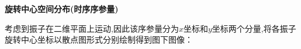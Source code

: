 \documentclass{article}
\begin{document}


\newpage
\noindent\textbf{旋转中心空间分布(时序序参量)}

考虑到振子在二维平面上运动,因此该序参量分为$x$坐标和$y$坐标两个分量,将各振子旋转中心坐标以散点图形式分别绘制得到图下图像：
\end{document}
